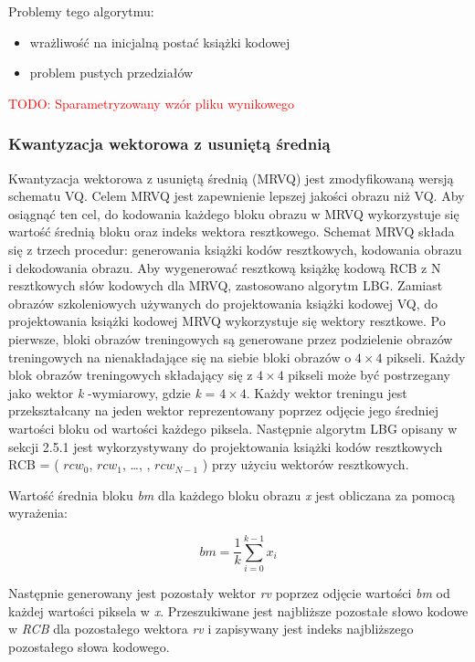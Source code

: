 \documentclass{article}
\newcommand{\todo}[1]{\textcolor{red}{TODO: #1}}
\begin{document}
Problemy tego algorytmu:

\begin{itemize}
	\item wrażliwość na inicjalną postać książki kodowej 
	\item problem pustych przedziałów 
\end{itemize}

\todo{Sparametryzowany wzór pliku wynikowego}

\subsubsection{Kwantyzacja wektorowa z usuniętą średnią}

Kwantyzacja wektorowa z usuniętą średnią (MRVQ) jest zmodyfikowaną wersją schematu VQ. Celem MRVQ jest zapewnienie lepszej jakości obrazu niż VQ. Aby osiągnąć ten cel, do kodowania każdego bloku obrazu w MRVQ wykorzystuje się wartość średnią bloku oraz indeks wektora resztkowego. Schemat MRVQ składa się z trzech procedur: generowania książki kodów resztkowych, kodowania obrazu i dekodowania obrazu. Aby wygenerować resztkową książkę kodową RCB z N resztkowych słów kodowych dla MRVQ, zastosowano algorytm LBG. Zamiast obrazów szkoleniowych używanych do projektowania książki kodowej VQ, do projektowania książki kodowej MRVQ wykorzystuje się wektory resztkowe. Po pierwsze, bloki obrazów treningowych są generowane przez podzielenie obrazów treningowych na nienakładające się na siebie bloki obrazów o $4 \times 4$ pikseli. Każdy blok obrazów treningowych składający się z $4 \times 4$ pikseli może być postrzegany jako wektor \textit{k} -wymiarowy, gdzie \textit{k} = $4 \times 4$. Każdy wektor treningu jest przekształcany na jeden wektor reprezentowany poprzez odjęcie jego średniej wartości bloku od wartości każdego piksela. Następnie algorytm LBG opisany w sekcji 2.5.1 jest wykorzystywany do projektowania książki kodów resztkowych RCB = ( $rcw_{0}$, $rcw_{1}$, \dots , , $rcw_{N-1}$ ) przy użyciu wektorów resztkowych.

Wartość średnia bloku \textit{bm} dla każdego bloku obrazu \textit{x} jest obliczana za pomocą wyrażenia: 

\begin{equation}
bm = \frac{1}{k} \sum_{i=0}^{k-1} x_{i}
\end{equation}

Następnie generowany jest pozostały wektor \textit{rv} poprzez odjęcie wartości \textit{bm} od każdej wartości piksela w \textit{x}. Przeszukiwane jest najbliższe pozostałe słowo kodowe w \textit{RCB} dla pozostałego wektora \textit{rv} i zapisywany jest indeks najbliższego pozostałego słowa kodowego.\cite{meanremovedVQ} 
\end{document}
